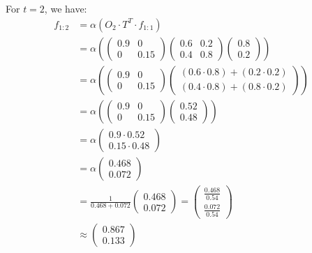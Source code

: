 For $t=2$, we have:
\begin{align*}
f_{1:2} &= \alpha \left( O_2 \cdot T^T \cdot f_{1:1} \right) \\
&= \alpha \left( 
\begin{pmatrix}
0.9 & 0 \\
0 & 0.15
\end{pmatrix}
\begin{pmatrix}
0.6 & 0.2 \\
0.4 & 0.8
\end{pmatrix}
\begin{pmatrix}
0.8 \\
0.2
\end{pmatrix}
\right) \\
&= \alpha \left( 
\begin{pmatrix}
0.9 & 0 \\
0 & 0.15
\end{pmatrix}
\begin{pmatrix}
(0.6 \cdot 0.8) + (0.2 \cdot 0.2) \\
(0.4 \cdot 0.8) + (0.8 \cdot 0.2)
\end{pmatrix}
\right) \\
&= \alpha \left( 
\begin{pmatrix}
0.9 & 0 \\
0 & 0.15
\end{pmatrix}
\begin{pmatrix}
0.52 \\
0.48
\end{pmatrix}
\right) \\
&= \alpha 
\begin{pmatrix}
0.9 \cdot 0.52 \\
0.15 \cdot 0.48
\end{pmatrix} \\
&= \alpha 
\begin{pmatrix}
0.468 \\
0.072
\end{pmatrix} \\
&= \frac{1}{0.468 + 0.072} \begin{pmatrix} 0.468 \\ 0.072 \end{pmatrix} = \begin{pmatrix} \frac{0.468}{0.54} \\ \frac{0.072}{0.54} \end{pmatrix} \\
&\approx \begin{pmatrix} 0.867 \\ 0.133 \end{pmatrix}
\end{align*}

